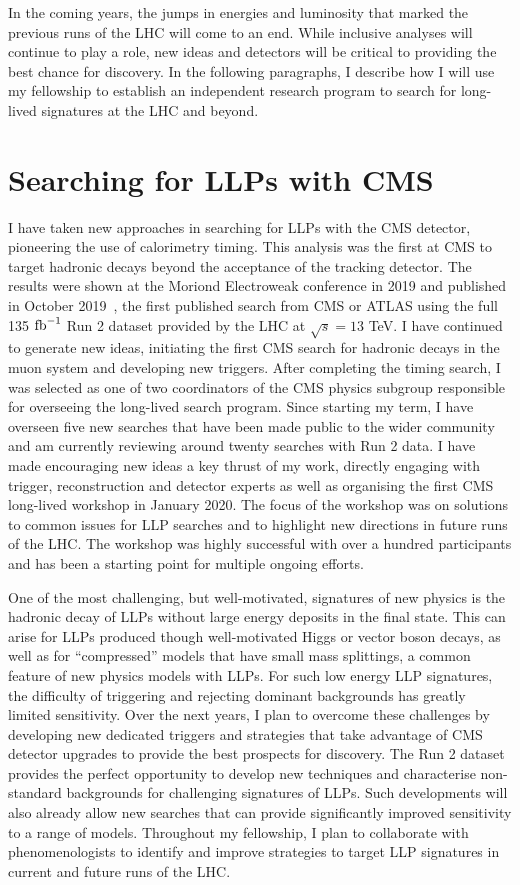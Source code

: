 \documentclass[11pt,a4paper]{article}
\theoremstyle{plain} \numberwithin{equation}{section}
\theoremstyle{definition}
\DeclareRobustCommand{\ifb}{$\rm{fb}^{-1}~$}
\begin{document}
In the coming years, the jumps in energies and luminosity that marked the previous runs of the 
LHC will come to an end. While inclusive analyses will continue to play a role, 
new ideas and detectors will be critical to 
providing the best chance for discovery. In the following paragraphs, I describe
how I will use my fellowship to establish an independent research program 
to search for long-lived signatures at the LHC and beyond.

\section*{Searching for LLPs with CMS}

I have taken new approaches in searching for LLPs with
the CMS detector, pioneering the use of calorimetry timing. 
This analysis was the first at CMS to target hadronic decays 
beyond the acceptance of the tracking detector. 
The results were shown at the Moriond Electroweak 
conference in 2019 and published in October 2019~\cite{2019134876}, 
the first published search from CMS or ATLAS using the 
full 135 \ifb Run 2 dataset provided by the LHC at $\sqrt{s} = 13$ TeV. 
I have continued to generate new ideas, initiating the first 
CMS search for hadronic decays in the muon system
and developing new triggers. 
After completing the timing search, I was selected as one of two 
coordinators of the CMS physics subgroup responsible for overseeing
the long-lived search program. Since starting
my term, I have overseen five new searches that have been made public to the wider community 
and am currently reviewing around twenty searches with Run 2 data.
I have made encouraging new ideas a key thrust of my work, directly engaging with
trigger, reconstruction and detector experts as well as organising the 
first CMS long-lived workshop in January 2020. The focus of the workshop was 
on solutions to common issues for LLP searches and 
to highlight new directions in future runs of the LHC.  
The workshop was highly successful with over a hundred participants and
has been a starting point for multiple ongoing efforts. 

One of the most challenging, but well-motivated, signatures
of new physics is the hadronic decay of LLPs without large
energy deposits in the final state. This can
arise for LLPs produced though
well-motivated Higgs or vector boson decays, as well as for ``compressed'' models 
that have small mass splittings, a common 
feature of new physics models with LLPs.
For such low energy LLP signatures, the difficulty of triggering and rejecting dominant 
backgrounds has greatly limited sensitivity. Over the next years, I plan to overcome
these challenges by developing new dedicated triggers and strategies that 
take advantage of CMS detector upgrades to provide the best prospects for discovery.
The Run 2 dataset provides the perfect opportunity to develop new techniques 
and characterise non-standard backgrounds for challenging signatures of
LLPs. Such developments will also already allow new searches that can provide 
significantly improved sensitivity to a range of models. 
Throughout my fellowship, I plan to collaborate with
phenomenologists to identify and improve strategies to target LLP signatures in current
and future runs of the LHC.
    
\end{document}
